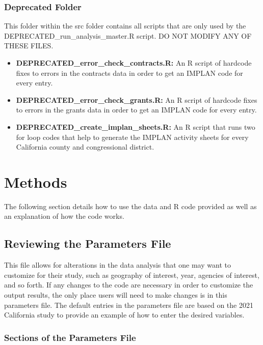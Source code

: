 \documentclass[
]{book}
\providecommand{\tightlist}{%
  \setlength{\itemsep}{0pt}\setlength{\parskip}{0pt}}
\begin{document}
\hypertarget{deprecated-folder-1}{%
\subsection{Deprecated Folder}\label{deprecated-folder-1}}

This folder within the src folder contains all scripts that are only used by the DEPRECATED\_run\_analysis\_master.R script. DO NOT MODIFY ANY OF THESE FILES.

\begin{itemize}
\tightlist
\item
  \textbf{DEPRECATED\_error\_check\_contracts.R:} An R script of hardcode fixes to errors in the contracts data in order to get an IMPLAN code for every entry.
\item
  \textbf{DEPRECATED\_error\_check\_grants.R:} An R script of hardcode fixes to errors in the grants data in order to get an IMPLAN code for every entry.\\
\item
  \textbf{DEPRECATED\_create\_implan\_sheets.R:} An R script that runs two for loop codes that help to generate the IMPLAN activity sheets for every California county and congressional district.
\end{itemize}

\hypertarget{methods}{%
\chapter{Methods}\label{methods}}

The following section details how to use the data and R code provided as well as an explanation of how the code works.

\hypertarget{review-p}{%
\section{Reviewing the Parameters File}\label{review-p}}

This file allows for alterations in the data analysis that one may want to customize for their study, such as geography of interest, year, agencies of interest, and so forth. If any changes to the code are necessary in order to customize the output results, the only place users will need to make changes is in this parameters file. The default entries in the parameters file are based on the 2021 California study to provide an example of how to enter the desired variables.

\hypertarget{sections-p}{%
\subsection{Sections of the Parameters File}\label{sections-p}}
\end{document}
